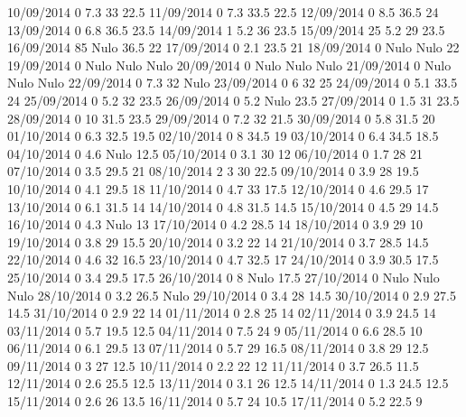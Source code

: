 10/09/2014  0      7.3    33     22.5 
11/09/2014  0      7.3    33.5   22.5 
12/09/2014  0      8.5    36.5   24 
13/09/2014  0      6.8    36.5   23.5 
14/09/2014  1      5.2    36     23.5 
15/09/2014  25     5.2    29     23.5 
16/09/2014  85    Nulo    36.5   22 
17/09/2014  0      2.1    23.5   21 
18/09/2014  0     Nulo   Nulo    22 
19/09/2014  0     Nulo   Nulo   Nulo
20/09/2014  0     Nulo   Nulo   Nulo
21/09/2014  0     Nulo   Nulo   Nulo
22/09/2014  0      7.3    32    Nulo
23/09/2014  0      6      32     25 
24/09/2014  0      5.1    33.5   24 
25/09/2014  0      5.2    32     23.5 
26/09/2014  0      5.2   Nulo    23.5 
27/09/2014  0      1.5    31     23.5 
28/09/2014  0      10     31.5   23.5 
29/09/2014  0      7.2    32     21.5 
30/09/2014  0      5.8    31.5   20 
01/10/2014  0      6.3    32.5   19.5 
02/10/2014  0      8      34.5   19 
03/10/2014  0      6.4    34.5   18.5 
04/10/2014  0      4.6   Nulo    12.5 
05/10/2014  0      3.1    30     12 
06/10/2014  0      1.7    28     21 
07/10/2014  0      3.5    29.5   21 
08/10/2014  2      3      30     22.5 
09/10/2014  0      3.9    28     19.5 
10/10/2014  0      4.1    29.5   18 
11/10/2014  0      4.7    33     17.5 
12/10/2014  0      4.6    29.5   17 
13/10/2014  0      6.1    31.5   14 
14/10/2014  0      4.8    31.5   14.5 
15/10/2014  0      4.5    29     14.5 
16/10/2014  0      4.3   Nulo    13 
17/10/2014  0      4.2    28.5   14 
18/10/2014  0      3.9    29     10 
19/10/2014  0      3.8    29     15.5 
20/10/2014  0      3.2    22     14 
21/10/2014  0      3.7    28.5   14.5 
22/10/2014  0      4.6    32     16.5 
23/10/2014  0      4.7    32.5   17 
24/10/2014  0      3.9    30.5   17.5 
25/10/2014  0      3.4    29.5   17.5 
26/10/2014  0      8     Nulo    17.5 
27/10/2014  0     Nulo   Nulo   Nulo
28/10/2014  0      3.2    26.5  Nulo
29/10/2014  0      3.4    28     14.5 
30/10/2014  0      2.9    27.5   14.5 
31/10/2014  0      2.9    22     14 
01/11/2014  0      2.8    25     14 
02/11/2014  0      3.9    24.5   14 
03/11/2014  0      5.7    19.5   12.5 
04/11/2014  0      7.5    24     9 
05/11/2014  0      6.6    28.5   10 
06/11/2014  0      6.1    29.5   13 
07/11/2014  0      5.7    29     16.5 
08/11/2014  0      3.8    29     12.5 
09/11/2014  0      3      27     12.5 
10/11/2014  0      2.2    22     12 
11/11/2014  0      3.7    26.5   11.5 
12/11/2014  0      2.6    25.5   12.5 
13/11/2014  0      3.1    26     12.5 
14/11/2014  0      1.3    24.5   12.5 
15/11/2014  0      2.6    26     13.5 
16/11/2014  0      5.7    24     10.5 
17/11/2014  0      5.2    22.5   9 
